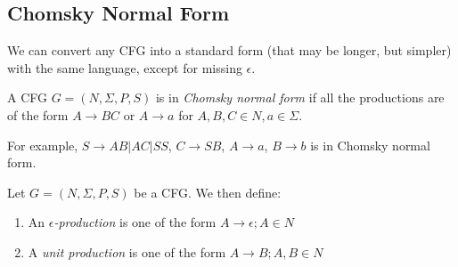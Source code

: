 \documentclass[10pt,a4paper]{article}
\begin{document}
\subsection*{Chomsky Normal Form}
We can convert any CFG into a standard form (that may be longer, but simpler) with the same language, except for missing $\epsilon$.

A CFG $G = (N, \Sigma, P, S)$ is in \emph{Chomsky normal form} if all the productions are of the form $A \to BC$ or $A \to a$ for $A,B,C\in N, a \in \Sigma$.

For example, $S \to AB|AC|SS$, $C \to SB$, $A \to a$, $B \to b$ is in Chomsky normal form.

Let $G = (N, \Sigma, P, S)$ be a CFG. We then define:
\begin{enumerate}
\item An \emph{$\epsilon$-production} is one of the form $A \to \epsilon; A \in N$
\item A \emph{unit production} is one of the form $A \to B; A,B \in N$ 
\end{enumerate}
\end{document}

